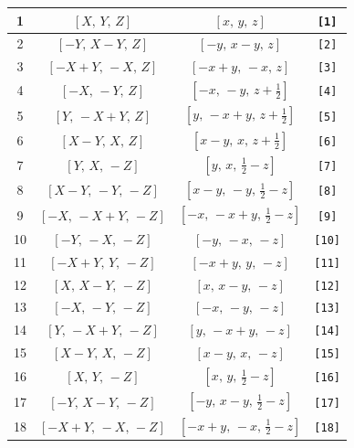 \documentclass[fleqn,8pt]{jsarticle}
\begin{document}
\begin{longtable}{cccc}
1 & $\left[ X,\, Y,\, Z \right]$ & $\left[ x,\, y,\, z \right]$ & {\tt [1]} \\ \hline
2 & $\left[ - Y,\, X - Y,\, Z \right]$ & $\left[ - y,\, x - y,\, z \right]$ & {\tt [2]} \\ \hline
3 & $\left[ - X + Y,\, - X,\, Z \right]$ & $\left[ - x + y,\, - x,\, z \right]$ & {\tt [3]} \\ \hline
4 & $\left[ - X,\, - Y,\, Z \right]$ & $\left[ - x,\, - y,\, z + \frac{1}{2} \right]$ & {\tt [4]} \\ \hline
5 & $\left[ Y,\, - X + Y,\, Z \right]$ & $\left[ y,\, - x + y,\, z + \frac{1}{2} \right]$ & {\tt [5]} \\ \hline
6 & $\left[ X - Y,\, X,\, Z \right]$ & $\left[ x - y,\, x,\, z + \frac{1}{2} \right]$ & {\tt [6]} \\ \hline
7 & $\left[ Y,\, X,\, - Z \right]$ & $\left[ y,\, x,\, \frac{1}{2} - z \right]$ & {\tt [7]} \\ \hline
8 & $\left[ X - Y,\, - Y,\, - Z \right]$ & $\left[ x - y,\, - y,\, \frac{1}{2} - z \right]$ & {\tt [8]} \\ \hline
9 & $\left[ - X,\, - X + Y,\, - Z \right]$ & $\left[ - x,\, - x + y,\, \frac{1}{2} - z \right]$ & {\tt [9]} \\ \hline
10 & $\left[ - Y,\, - X,\, - Z \right]$ & $\left[ - y,\, - x,\, - z \right]$ & {\tt [10]} \\ \hline
11 & $\left[ - X + Y,\, Y,\, - Z \right]$ & $\left[ - x + y,\, y,\, - z \right]$ & {\tt [11]} \\ \hline
12 & $\left[ X,\, X - Y,\, - Z \right]$ & $\left[ x,\, x - y,\, - z \right]$ & {\tt [12]} \\ \hline
13 & $\left[ - X,\, - Y,\, - Z \right]$ & $\left[ - x,\, - y,\, - z \right]$ & {\tt [13]} \\ \hline
14 & $\left[ Y,\, - X + Y,\, - Z \right]$ & $\left[ y,\, - x + y,\, - z \right]$ & {\tt [14]} \\ \hline
15 & $\left[ X - Y,\, X,\, - Z \right]$ & $\left[ x - y,\, x,\, - z \right]$ & {\tt [15]} \\ \hline
16 & $\left[ X,\, Y,\, - Z \right]$ & $\left[ x,\, y,\, \frac{1}{2} - z \right]$ & {\tt [16]} \\ \hline
17 & $\left[ - Y,\, X - Y,\, - Z \right]$ & $\left[ - y,\, x - y,\, \frac{1}{2} - z \right]$ & {\tt [17]} \\ \hline
18 & $\left[ - X + Y,\, - X,\, - Z \right]$ & $\left[ - x + y,\, - x,\, \frac{1}{2} - z \right]$ & {\tt [18]} \\ \hline

\end{longtable}
\end{document}
